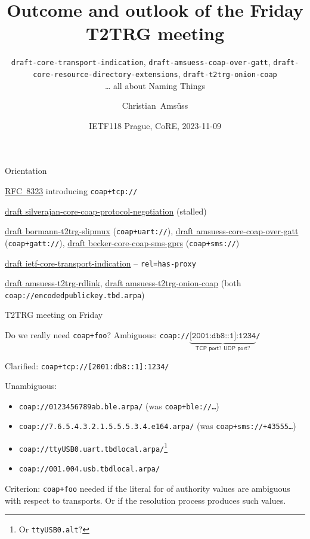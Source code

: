 \documentclass[aspectratio=169,colorlinks]{beamer}
\title{Outcome and outlook of the Friday T2TRG meeting}
\subtitle[]{
  \texttt{draft-core-transport-indication},
  \texttt{draft-amsuess-coap-over-gatt},
  \texttt{draft-core-resource-directory-extensions},
  \texttt{draft-t2trg-onion-coap}\\
  … all about Naming Things
}
\author{Christian~Amsüss}
\date{IETF118 Prague, CoRE, 2023-11-09}
\newcommand{\rfc}[1]{\href{https://datatracker.ietf.org/doc/html/rfc#1}{RFC~#1}}
\newcommand{\ietfdraft}[1]{\href{https://datatracker.ietf.org/doc/draft-#1/}{draft #1}}
\begin{document}
\frame{\titlepage}

\begin{frame}{Orientation}\large
  \begin{description}
    \item[Origin:] \rfc{8323} introducing \texttt{coap+tcp://}
    \item[led to:] \ietfdraft{silverajan-core-coap-protocol-negotiation} (stalled)
    \item[used by:] {\footnotesize \ietfdraft{bormann-t2trg-slipmux} (\texttt{coap+uart://}), \ietfdraft{amsuess-core-coap-over-gatt} (\texttt{coap+gatt://}), \ietfdraft{becker-core-coap-sms-gprs} (\texttt{coap+sms://})}
    \item[reboot:] \ietfdraft{ietf-core-transport-indication} -- \texttt{rel=has-proxy}
    \item[more users:] \ietfdraft{amsuess-t2trg-rdlink}, \ietfdraft{amsuess-t2trg-onion-coap} (both \texttt{coap://encodedpublickey.tbd.arpa})

      \bigskip

    \item T2TRG meeting on Friday
  \end{description}
\end{frame}

\begin{frame}{Do we really need \texttt{coap+foo}?}\large
  Ambiguous: \texttt{coap://$\underbrace{\texttt{[2001:db8::1]:1234}}_{\textsf{TCP port? UDP port?}}$/}

  Clarified: \texttt{coap+tcp://[2001:db8::1]:1234/}

  \bigskip

  Unambiguous:
  \begin{itemize}
    \item \texttt{coap://0123456789ab.ble.arpa/} (was \texttt{coap+ble://\ldots})
    \item \texttt{coap://7.6.5.4.3.2.1.5.5.5.3.4.e164.arpa/} (was \texttt{coap+sms://+43555\ldots})
    \item \texttt{coap://ttyUSB0.uart.tbdlocal.arpa/}\footnote{Or \texttt{ttyUSB0.alt}?} %
    \item \texttt{coap://001.004.usb.tbdlocal.arpa/}
  \end{itemize}

  \bigskip

  Criterion: \texttt{coap+foo} needed if the literal for of authority values are ambiguous with respect to transports. Or if the resolution process produces such values.
\end{frame}
\end{document}
